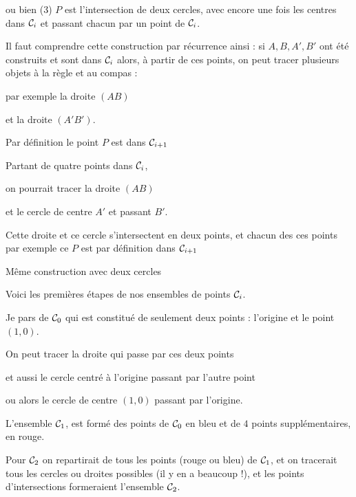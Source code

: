\change
ou bien (3) $P$ est l'intersection de deux cercles, avec encore une fois les centres 
dans $\mathcal{C}_i$ et passant chacun par un point de $\mathcal{C}_i$.


\diapo

Il faut comprendre cette construction par récurrence ainsi : si 
$A,B, A', B'$ ont été construits et sont dans $\mathcal{C}_i$ 
alors, à partir de ces points, on peut tracer plusieurs objets à
la règle et au compas : 

\change
par exemple la droite $(AB)$ 

\change
et la droite $(A'B')$.

\change
Par définition le point $P$ est dans $\mathcal{C}_{i+1}$

\change
Partant de quatre points dans $\mathcal{C}_i$,

\change
on pourrait tracer la droite $(AB)$ 

\change
et le cercle de centre $A'$ et passant $B'$.

\change
Cette droite et ce cercle s'intersectent en deux points, 
et chacun des ces points par exemple ce $P$ est par définition 
dans $\mathcal{C}_{i+1}$


\change
Même construction avec deux cercles

\change

\change

\change


\diapo

Voici les premières étapes de nos ensembles de points $\mathcal{C}_i$.

Je pars de $\mathcal{C}_0$ qui est constitué de seulement deux points : l'origine et le point $(1,0)$.

\change
On peut tracer la droite qui passe par ces deux points

\change
et aussi le cercle centré à l'origine passant par l'autre point

\change
ou alors le cercle de centre $(1,0)$ passant par l'origine.

\change
L'ensemble $\mathcal{C}_1$, est formé des points de $\mathcal{C}_0$ en bleu et de
$4$ points supplémentaires, en rouge.


Pour $\mathcal{C}_2$ on repartirait de tous les points (rouge ou bleu) 
de $\mathcal{C}_1$, et on tracerait tous les cercles ou droites 
possibles (il y en a beaucoup !), et les points d'intersections 
formeraient l'ensemble $\mathcal{C}_2$.


